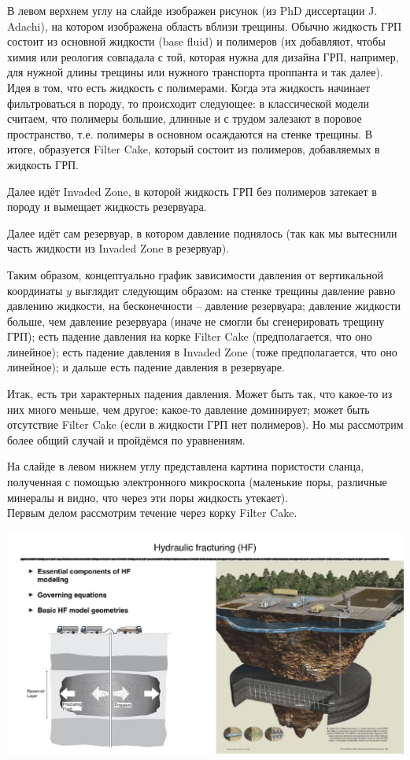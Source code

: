 \documentclass[main.tex]{subfiles}
\begin{document}
В левом верхнем углу на слайде изображен рисунок (из PhD диссертации J. Adachi), на котором изображена область вблизи трещины.
Обычно жидкость ГРП состоит из основной жидкости (base fluid) и полимеров (их добавляют, чтобы химия или реология совпадала с той, которая нужна для дизайна ГРП, например, для нужной длины трещины или нужного транспорта проппанта и так далее).
Идея в том, что есть жидкость с полимерами.
Когда эта жидкость начинает фильтроваться в породу, то происходит следующее: в классической модели считаем, что полимеры большие, длинные и с трудом залезают в поровое пространство, т.е. полимеры в основном осаждаются на стенке трещины.
В итоге, образуется Filter Cake, который состоит из полимеров, добавляемых в жидкость ГРП.

Далее идёт Invaded Zone, в которой жидкость ГРП без полимеров затекает в породу и вымещает жидкость резервуара.

Далее идёт сам резервуар, в котором давление поднялось (так как мы вытеснили часть жидкости из Invaded Zone в резервуар).

Таким образом, концептуально график зависимости давления от вертикальной координаты $y$ выглядит следующим образом: на стенке трещины давление равно давлению жидкости, на бесконечности -- давление резервуара; 
давление жидкости больше, чем давление резервуара (иначе не смогли бы сгенерировать трещину ГРП);
есть падение давления на корке Filter Cake (предполагается, что оно линейное);
есть падение давления в Invaded Zone (тоже предполагается, что оно линейное);
и дальше есть падение давления в резервуаре.

Итак, есть три характерных падения давления.
Может быть так, что какое-то из них много меньше, чем другое; какое-то давление доминирует; может быть отсутствие Filter Cake (если в жидкости ГРП нет полимеров).
Но мы рассмотрим более общий случай и пройдёмся по уравнениям.

На слайде в левом нижнем углу представлена картина пористости сланца, полученная с помощью электронного микроскопа (маленькие поры, различные минералы и видно, что через эти поры жидкость утекает).
\\

Первым делом рассмотрим течение через корку Filter Cake.


\includegraphics[width=\textwidth, page=4]{HF_slides.pdf}
\end{document}
